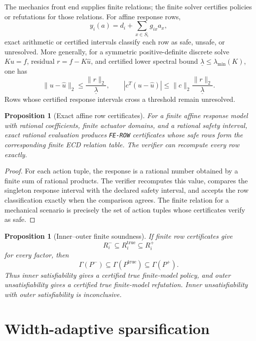 \documentclass[11pt]{article}
\theoremstyle{plain}
\newtheorem{proposition}[theorem]{Proposition}
\theoremstyle{definition}
\theoremstyle{remark}
\begin{document}
The mechanics front end supplies finite relations; the finite solver certifies
policies or refutations for those relations.  For affine response rows,
\[
  y_i(a)=d_i+\sum_{x\in S_i}g_{ix}a_x,
\]
exact arithmetic or certified intervals classify each row as safe, unsafe, or
unresolved.  More generally, for a symmetric positive-definite discrete solve
\(Ku=f\), residual \(r=f-K\widehat u\), and certified lower spectral bound
\(\underline\lambda\le\lambda_{
\min}(K)\), one has
\[
  \|u-\widehat u\|_2\le \frac{\|r\|_2}{\underline\lambda},
  \qquad
  |c^T(u-\widehat u)|\le
  \|c\|_2\frac{\|r\|_2}{\underline\lambda}.
\]
Rows whose certified response intervals cross a threshold remain unresolved.

\begin{proposition}[Exact affine row certificates]
\label{prop:exact-affine-row-certificates}
For a finite affine response model with rational coefficients, finite actuator
domains, and a rational safety interval, exact rational evaluation produces
\texttt{FE-ROW} certificates whose safe rows form the corresponding finite ECD
relation table.  The verifier can recompute every row exactly.
\end{proposition}

\begin{proof}
For each action tuple, the response is a rational number obtained by a finite
sum of rational products.  The verifier recomputes this value, compares the
singleton response interval with the declared safety interval, and accepts the
row classification exactly when the comparison agrees.  The finite relation for
a mechanical scenario is precisely the set of action tuples whose certificates
verify as safe.
\end{proof}

\begin{proposition}[Inner--outer finite soundness]
If finite row certificates give
\[
  R_i^-\subseteq R_i^{\mathrm{true}}\subseteq R_i^+
\]
for every factor, then
\[
  \Gamma(P^-)\subseteq\Gamma(P^{\mathrm{true}})\subseteq\Gamma(P^+).
\]
Thus inner satisfiability gives a certified true finite-model policy, and outer
unsatisfiability gives a certified true finite-model refutation.  Inner
unsatisfiability with outer satisfiability is inconclusive.
\end{proposition}

\section{Width-adaptive sparsification}
\label{sec:sparsification}
\end{document}

